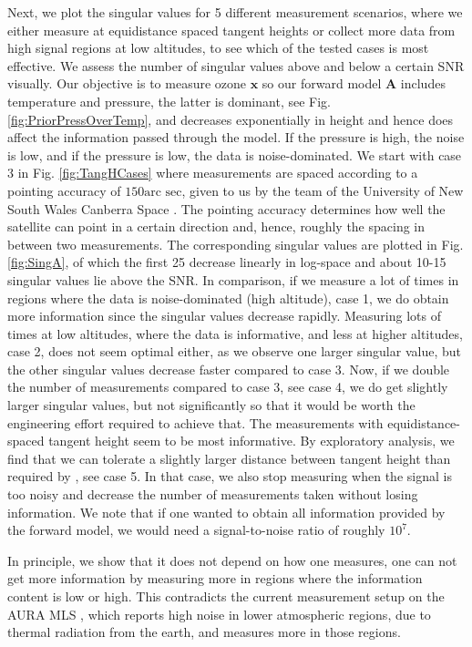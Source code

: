 Next, we plot the singular values for 5 different measurement scenarios, where we either measure at equidistance spaced tangent heights or collect more data from high signal regions at low altitudes, to see which of the tested cases is most effective.
We assess the number of singular values above and below a certain SNR visually.
Our objective is to measure ozone $\bm{x}$ so our forward model $\bm{A}$ includes temperature and pressure, the latter is dominant, see Fig. \ref{fig:PriorPressOverTemp}, and decreases exponentially in height and hence does affect the information passed through the model.
If the pressure is high, the noise is low, and if the pressure is low, the data is noise-dominated.
We start with case 3 in Fig. \ref{fig:TangHCases} where measurements are spaced according to a pointing accuracy of $150\text{arc sec}$, given to us by the team of the University of New South Wales Canberra Space \cite{CubeSatInternal}.
The pointing accuracy determines how well the satellite can point in a certain direction and, hence, roughly the spacing in between two measurements.
The corresponding singular values are plotted in Fig. \ref{fig:SingA}, of which the first 25 decrease linearly in log-space and about 10-15 singular values lie above the SNR.
In comparison, if we measure a lot of times in regions where the data is noise-dominated (high altitude), case 1, we do obtain more information since the singular values decrease rapidly.
Measuring lots of times at low altitudes, where the data is informative, and less at higher altitudes, case 2, does not seem optimal either, as we observe one larger singular value, but the other singular values decrease faster compared to case 3.
Now, if we double the number of measurements compared to case 3, see case 4, we do get slightly larger singular values, but not significantly so that it would be worth the engineering effort required to achieve that.
The measurements with equidistance-spaced tangent height seem to be most informative.
By exploratory analysis, we find that we can tolerate a slightly larger distance between tangent height than required by \cite{CubeSatInternal}, see case 5.
In that case, we also stop measuring when the signal is too noisy and decrease the number of measurements taken without losing information.
We note that if one wanted to obtain all information provided by the forward model, we would need a signal-to-noise ratio of roughly $10^7$.

In principle, we show that it does not depend on how one measures, one can not get more information by measuring more in regions where the information content is low or high.
This contradicts the current measurement setup on the AURA MLS  \cite{livesey2006retrieval}, which reports high noise in lower atmospheric regions, due to thermal radiation from the earth, and measures more in those regions.


